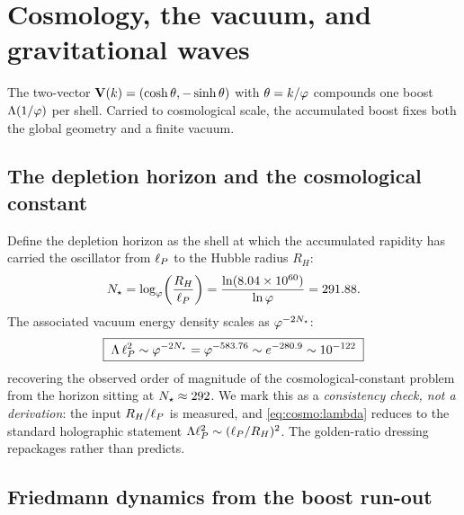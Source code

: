 \section{Cosmology, the vacuum, and gravitational waves}
\label{sec:cosmo}

The two-vector $\mathbf{V}(k)=(\cosh\theta,-\sinh\theta)$ with $\theta=k/\varphi$ compounds one boost $\Lambda(1/\varphi)$ per shell. Carried to cosmological scale, the accumulated boost fixes both the global geometry and a finite vacuum.

\subsection{The depletion horizon and the cosmological constant}

Define the depletion horizon as the shell at which the accumulated rapidity has carried the oscillator from $\ell_{P}$ to the Hubble radius $R_H$:
\begin{equation}
N_{\star}=\log_{\varphi}\!\left(\frac{R_H}{\ell_{P}}\right)
=\frac{\ln(8.04\times10^{60})}{\ln\varphi}=291.88 .
\label{eq:cosmo:nstar}
\end{equation}
The associated vacuum energy density scales as $\varphi^{-2N_{\star}}$:
\begin{equation}
\boxed{\;\Lambda\,\ell_{P}^{2}\sim\varphi^{-2N_{\star}}=\varphi^{-583.76}
\sim e^{-280.9}\sim 10^{-122}\;}
\label{eq:cosmo:lambda}
\end{equation}
recovering the observed order of magnitude of the cosmological-constant problem from the horizon sitting at $N_{\star}\approx292$. We mark this as a \emph{consistency check, not a derivation}: the input $R_H/\ell_{P}$ is measured, and \eqref{eq:cosmo:lambda} reduces to the standard holographic statement $\Lambda\ell_{P}^{2}\sim(\ell_{P}/R_H)^2$. The golden-ratio dressing repackages rather than predicts.

\subsection{Friedmann dynamics from the boost run-out}

